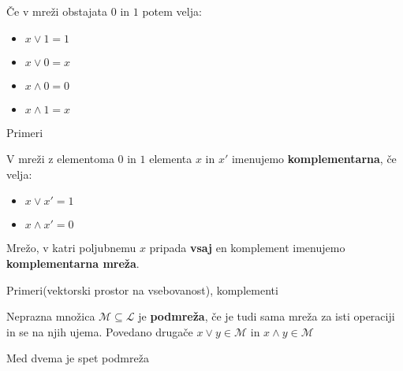 \documentclass{beamer}
\begin{document}
\begin{frame}
\begin{block}{}
Če v mreži obstajata $0$ in $1$ potem velja:
\begin{itemize}
\item $x \lor 1 = 1$
\item $x \lor 0 = x$
\item $x \land 0 = 0$
\item $x \land 1 = x$
\end{itemize}
\end{block}

Primeri
\end{frame}

\begin{frame}
\begin{definition}
V mreži z elementoma $0$ in $1$ elementa $x$ in $x'$ imenujemo \textbf{komplementarna}, če velja:
\begin{itemize}
\item $x \lor x' = 1$
\item $x \land x' = 0$
\end{itemize}
\end{definition}

\begin{definition}
Mrežo, v katri poljubnemu $x$ pripada \textbf{vsaj} en komplement imenujemo \textbf{komplementarna mreža}.
\end{definition}

\end{frame}

\begin{frame}
Primeri(vektorski prostor na vsebovanost), komplementi
\end{frame}

\begin{frame}
\begin{definition}
Neprazna množica $\mathcal{M} \subseteq \mathcal{L}$ je \textbf{podmreža}, če je tudi sama mreža za isti operaciji in se na njih ujema. Povedano drugače $x \lor y \in \mathcal{M}$ in $x \land y \in \mathcal{M}$
\end{definition}
\end{frame}

\begin{frame}
Med dvema je spet podmreža
\end{frame}
\end{document}
